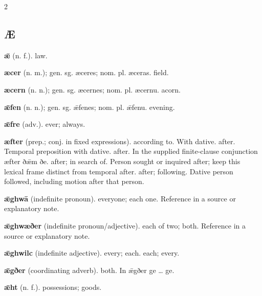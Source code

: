 \begin{multicols*}{2}
\subsection*{Æ}
\textbf{ǣ} (n. f.). law.\par
\textbf{æcer} (n. m.); gen. sg. æceres; nom. pl. æceras. field.\par
\textbf{æcern} (n. n.); gen. sg. æcernes; nom. pl. æcernu. acorn.\par
\textbf{ǣfen} (n. n.); gen. sg. ǣfenes; nom. pl. ǣfenu. evening.\par
\textbf{ǣfre} (adv.). ever; always.\par
\textbf{æfter} (prep.; conj. in fixed expressions). according to. With dative. after. Temporal preposition with dative. after. In the supplied finite-clause conjunction æfter ðǣm ðe. after; in search of. Person sought or inquired after; keep this lexical frame distinct from temporal after. after; following. Dative person followed, including motion after that person.\par
\textbf{ǣghwā} (indefinite pronoun). everyone; each one. Reference in a source or explanatory note.\par
\textbf{ǣghwæðer} (indefinite pronoun/adjective). each of two; both. Reference in a source or explanatory note.\par
\textbf{ǣghwilc} (indefinite adjective). every; each. each; every.\par
\textbf{ǣgðer} (coordinating adverb). both. In ǣgðer ge … ge.\par
\textbf{ǣht} (n. f.). possessions; goods.\par

\end{multicols*}
